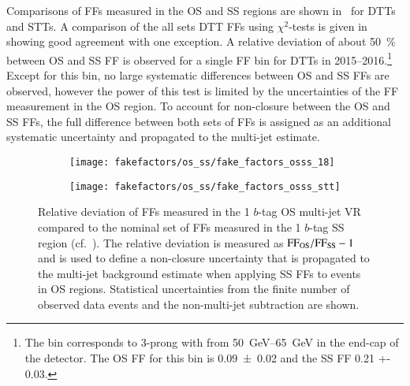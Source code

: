 Comparisons of FFs measured in the OS and SS regions are shown
in~ for DTTs and STTs. A comparison of the all sets
DTT FFs using $\chi^2$-tests is given in~
showing good agreement with one exception. %
A relative deviation of about \SI{50}{\percent} between OS and SS FF is observed
for a single FF bin for DTTs in 2015--2016.\footnote{The bin corresponds to
  3-prong \tauhadvis with \pT from \SIrange{50}{65}{\GeV} in the end-cap of the
  detector. The OS FF for this bin is \num{0.09 +- 0.02} and the SS FF \num{0.21
    +- 0.03}.}  Except for this bin, no large systematic differences between OS
and SS FFs are observed, however the power of this test is limited by the
uncertainties of the FF measurement in the OS region. To account for non-closure
between the OS and SS FFs, the full difference between both sets of FFs is
assigned as an additional systematic uncertainty and propagated to the multi-jet
estimate.


\begin{figure}[htbp]
  \centering

  \begin{subfigure}[t]{0.48\textwidth}
    \texttt{[image: fakefactors/os\_ss/fake\_factors\_osss\_18]}
    \label{fig:fake_factor_OSSS_dtt}
  \end{subfigure}\hfill%
  \begin{subfigure}[t]{0.48\textwidth}
    \texttt{[image: fakefactors/os\_ss/fake\_factors\_osss\_stt]}
    \label{fig:fake_factor_OSSS_stt}
  \end{subfigure}

  \caption{Relative deviation of FFs measured in the 1 $b$-tag OS multi-jet VR
    compared to the nominal set of FFs measured in the 1 $b$-tag SS region (cf.\
    ). The relative deviation
    is measured as $\text{FF}_\text{OS} / \text{FF}_\text{SS} - 1$ and is used to define a
    non-closure uncertainty that is propagated to the multi-jet background
    estimate when applying SS FFs to events in OS regions. Statistical
    uncertainties from the finite number of observed data events and the
    non-multi-jet subtraction are shown.}
  \label{fig:fake_factor_OSSS}
\end{figure}


